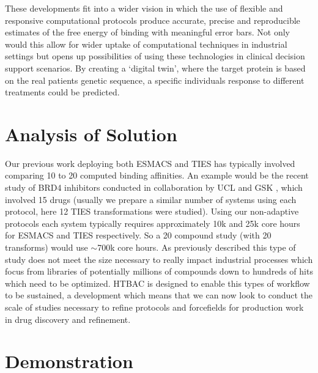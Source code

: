 \documentclass[conference]{IEEEtran}
\begin{document}
These developments fit into a wider vision in which the use of
flexible and responsive computational protocols produce accurate,
precise and reproducible estimates of the free energy of binding with
meaningful error bars. Not only would this allow for wider uptake of
computational techniques in industrial settings but opens up possibilities
of using these technologies in clinical decision support scenarios. By creating
a `digital twin', where the target protein is based on the real patients
genetic sequence, a specific individuals response to different
treatments could be predicted.


\section{Analysis of Solution}\label{sec:analysis}

Our previous work deploying both ESMACS and TIES has typically involved comparing 10 to 20 computed
binding affinities.
An example would be the recent study of BRD4 inhibitors conducted in collaboration by UCL and GSK \cite{Wan2017brd4}, which involved 15 drugs (usually we prepare a similar number of systems using each protocol, here 12 TIES transformations were studied).
Using our non-adaptive protocols each system typically requires approximately 10k and 25k core hours for ESMACS and TIES respectively.
So a 20 compound study (with 20 transforms) would use $\sim$700k core hours.
As previously described this type of study does not meet the size necessary to really impact industrial processes which focus from libraries of potentially millions of compounds down to hundreds of hits which need to be optimized.
HTBAC is designed to enable this types of workflow to be sustained, a development which means that we can now look to conduct the scale of studies necessary to refine protocols and forcefields for production work in drug discovery and refinement.



\section{Demonstration}\label{sec:demo}




\end{document}

